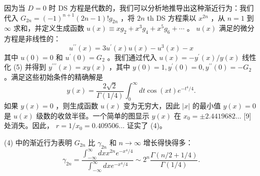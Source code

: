 \documentclass[UTF8]{article}
\begin{document}
因为当    \( D=0 \)    时 DS 方程是代数的，我们可以分析地推导出这种渐近行为：我们代入    \( G_{2 n}=(-1)^{n+1}(2 n-1) ! g_{2 n} \)    ，将    \( 2 n \)    th DS 方程乘以    \( x^{2 n} \)    ，从    \( n=1 \)    到    \( \infty \)    求和，并定义生成函数    \( u(x) \equiv x g_{2}+x^{3} g_{4}+x^{5} g_{6}+\cdots \)    。    \( u(x) \)    满足的微分方程是非线性的：
    \[u^{\prime \prime}(x)=3 u^{\prime}(x) u(x)-u^{3}(x)-x
\]    其中    \( u(0)=0 \)    和    \( u^{\prime}(0)=G_{2} \)    。我们通过代入    \( u(x)=-y^{\prime}(x) / y(x) \)    线性化 (5) 并得到    \( y^{\prime \prime \prime}(x)=x y(x) \)    ，其中    \( y(0)=1, y^{\prime}(0)=0, y^{\prime \prime}(0)=-G_{2} \)    。满足这些初始条件的精确解是
    \[y(x)=\frac{2 \sqrt{2}}{\Gamma(1 / 4)} \int_{0}^{\infty} d t \cos (x t) e^{-t^{4} / 4} .
\]    如果    \( y(x)=0 \)    ，则生成函数    \( u(x) \)    变为无穷大，因此    \( |x| \)    的最小值    \( y(x)=0 \)    是    \( u(x) \)    级数的收敛半径。一个简单的图显示    \( y(x) \)    在    \( x_{0}= \pm 2.4419682 \ldots \)    [9] 处消失。因此，    \( r=1 / x_{0}=0.409506 \ldots \)    证实了 (4)。

(4) 中的渐近行为表明    \( G_{2 n} \)    比    \( \gamma_{2 n} \)    和    \( n \rightarrow \infty \)    增长得快得多：
    \[
\gamma_{2 n}=\frac{\int_{-\infty}^{\infty} d x x^{2 n} e^{-x^{4} / 4}}{\int_{-\infty}^{\infty} d x e^{-x^{4} / 4}} \sim 2^{n} \frac{\Gamma(n / 2+1 / 4)}{\Gamma(1 / 4)} .
\]   
\end{document}
